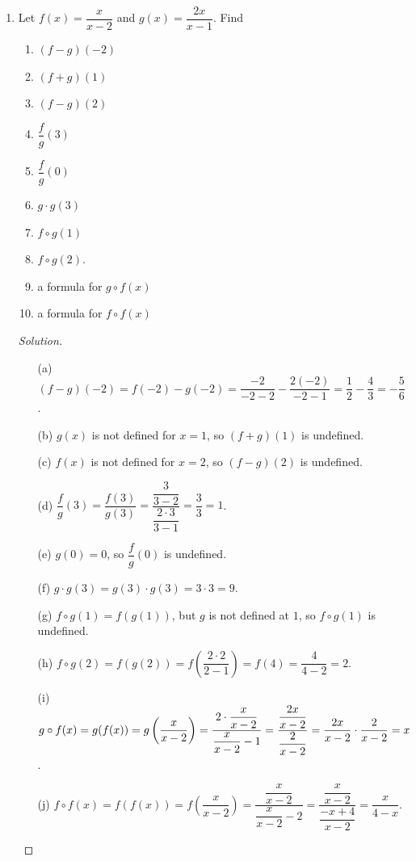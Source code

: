 \documentclass[12pt]{article}
\newenvironment{solution}{\begin{proof}[Solution]}{\end{proof}}
\begin{document}
	\begin{enumerate}
		\item Let $f(x)=\dfrac{x}{x-2}$ and $g(x)=\dfrac{2x}{x-1}$. Find
		\begin{enumerate}
			\item $(f-g)(-2)$
			
			\item $(f+g)(1)$
		
			\item $(f-g)(2)$
		
			\item $\dfrac{f}{g}(3)$
		
			\item $\dfrac{f}{g}(0)$
		
			\item $g\cdot g(3)$
		
			\item $f\circ g(1)$
			
			\item $f\circ g(2)$.
			\item a formula for $g \circ f(x)$
			
			\item a formula for $f \circ f (x)$
			
		\end{enumerate}
		
		\begin{solution}
			\begin{itemize}
				\item[(a)]	$(f-g)(-2)=f(-2)-g(-2)=\dfrac{-2}{-2-2}-\dfrac{2(-2)}{-2-1}=\dfrac{1}{2}-\dfrac{4}{3}=-\dfrac{5}{6}$.
				\item[(b)]	$g(x)$ is not defined for $x=1$, so $(f+g)(1)$ is undefined.
				\item[(c)] 	$f(x)$ is not defined for $x=2$, so $(f-g)(2)$ is undefined.
				\item[(d)]	$\dfrac{f}{g}(3)=\dfrac{f(3)}{g(3)}=\dfrac{\dfrac{3}{3-2}}{\dfrac{2\cdot 3}{3-1}}=\dfrac{3}{3}=1$.
				\item[(e)] 	$g(0)=0$, so $\dfrac{f}{g}(0)$ is undefined.
				\item[(f)] 	$g\cdot g(3)=g(3)\cdot g(3)=3\cdot 3=9.$
				\item[(g)] $f\circ g(1)=f(g(1))$, but $g$ is not defined at $1$, so $f\circ g(1)$ is undefined.
				\item[(h)]  $f\circ g(2)=f(g(2))=f\left(\dfrac{2\cdot 2}{2-1}\right)=f(4)=\dfrac{4}{4-2}=2$.
				\item[(i)] $g\circ f(x)=g(f(x))=g\left(\dfrac{x}{x-2}\right)=\dfrac{2\cdot\dfrac{x}{x-2}}{\dfrac{x}{x-2}-1}=\dfrac{\dfrac{2x}{x-2}}{\dfrac{2}{x-2}}\\=\dfrac{2x}{x-2}\cdot \dfrac{2}{x-2}=x$.
				\item[(j)] $f\circ f(x)=f(f(x))=f\left(\dfrac{x}{x-2}\right)=\dfrac{\dfrac{x}{x-2}}{\dfrac{x}{x-2}-2}=\dfrac{\dfrac{x}{x-2}}{\dfrac{-x+4}{x-2}}=\dfrac{x}{4-x}$.
			\end{itemize}
		\end{solution}
		

\end{enumerate}
\end{document}
